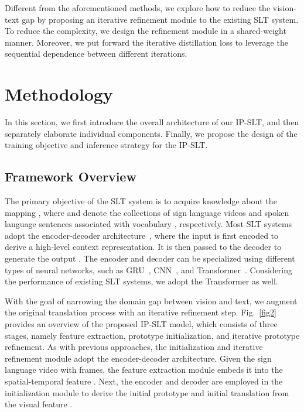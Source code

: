 \documentclass[10pt,twocolumn,letterpaper]{article}
\begin{document}
Different from the aforementioned methods, we explore how to reduce the vision-text gap by proposing an iterative refinement module to the existing SLT system. To reduce the complexity, we design the refinement module in a shared-weight manner.
Moreover, we put forward the iterative distillation loss to leverage the sequential dependence between different iterations.

\section{Methodology}

In this section, we first introduce the overall architecture of our IP-SLT, and then separately elaborate individual components. Finally, we propose the design of the training objective and inference strategy for the IP-SLT.

    \subsection{Framework Overview}
    The primary objective of the SLT system is to acquire knowledge about the mapping , where  and  denote the collections of  sign language videos and spoken language sentences associated with vocabulary , respectively. Most SLT systems adopt the encoder-decoder architecture~\cite{sutskever2014sequence}, where the input  is first encoded to derive a high-level context representation. It is then passed to the decoder to generate the output . The encoder and decoder can be specialized using different types of neural networks, such as GRU~\cite{bahdanau2014neural}, CNN~\cite{gehring2017convolutional}, and Transformer~\cite{vaswani2017attention}. 
    Considering the performance of existing SLT systems, we adopt the Transformer as well.
    
    With the goal of narrowing the domain gap between vision and text, we augment the original translation process with an iterative refinement step. Fig.~\ref{fig2} provides an overview of the proposed IP-SLT model, which consists of three stages, namely feature extraction, prototype initialization, and iterative prototype refinement. As with previous approaches, the initialization and iterative refinement module adopt the encoder-decoder architecture. Given the sign language video  with  frames, the feature extraction module embeds it into the spatial-temporal feature . Next, the encoder  and decoder  are employed in the initialization module to derive the initial prototype  and initial translation  from the visual feature . 
    
\end{document}
